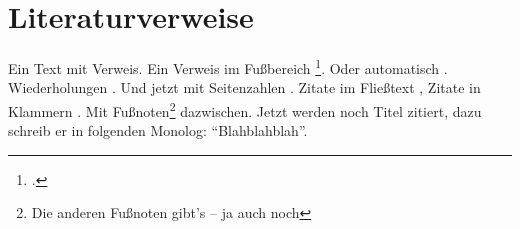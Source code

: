 \section{Literaturverweise}
\label{sec:Literaturverweise}

Ein Text \cite{Bell1942} mit Verweis. Ein Verweis im Fußbereich \footcite{Neustadt}. Oder automatisch \autocite{Stern2004}. Wiederholungen \cite{Bell1942}. Und jetzt mit Seitenzahlen \cite[vgl.][4-7]{Waller2002}. Zitate im Fließtext \textcite{Neustadt}, Zitate in Klammern \parencite{Bell1942}. Mit Fußnoten\footnote{Die anderen Fußnoten gibt's -- ja auch noch} dazwischen. Jetzt werden noch Titel zitiert, dazu schreib er in  folgenden Monolog: "`Blahblahblah"'.